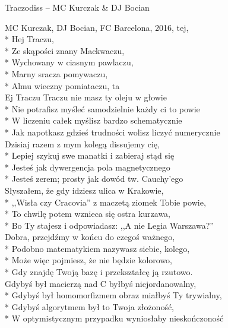 \begin{piosenka_dluga}{Traczodiss -- MC Kurczak \& DJ Bocian}

MC Kurczak, DJ Bocian, FC Barcelona, 2016, tej, \\*
Hej Traczu, \\*
Ze skąpości znany Mackwaczu, \\*
Wychowany w ciasnym pawlaczu, \\*
Marny sracza pomywaczu, \\*
Almu wieczny pomiataczu, ta \\[\zwrotkaspace]

Ej Traczu Traczu nie masz ty oleju w głowie \\*
 Nie potrafisz myśleć samodzielnie każdy ci to powie \\*
W liczeniu całek myślisz bardzo schematycznie \\*
Jak napotkasz gdzieś trudności wolisz liczyć numerycznie \\[\zwrotkaspace]

Dzisiaj razem z mym kolegą dissujemy cię, \\*
Lepiej szykuj swe manatki i zabieraj stąd się \\*
Jesteś jak dywergencja pola magnetycznego \\*
Jesteś zerem; prosty jak dowód tw. Cauchy’ego \\[\zwrotkaspace]

Słyszałem, że gdy idziesz ulica w Krakowie, \\*
,,Wisła czy Cracovia'' z maczetą ziomek Tobie powie, \\*
To chwilę potem wznieca się ostra kurzawa, \\*
Bo Ty stajesz i odpowiadasz: ,,A nie Legia Warszawa?'' \\[\zwrotkaspace]

Dobra, przejdźmy w końcu do czegoś ważnego, \\*
Podobno matematykiem nazywasz siebie, kolego, \\*
Może więc pojmiesz, że nie będzie kolorowo, \\*
Gdy znajdę Twoją bazę i przekształcę ją rzutowo. \\[\zwrotkaspace]

Gdybyś był macierzą nad C byłbyś niejordanowalny, \\* 
Gdybyś był homomorfizmem obraz miałbyś Ty trywialny, \\*
Gdybyś algorytmem był to Twoja złożoność, \\*
W optymistycznym przypadku wyniosłaby nieskończoność \\[\zwrotkaspace]


\end{piosenka_dluga}
